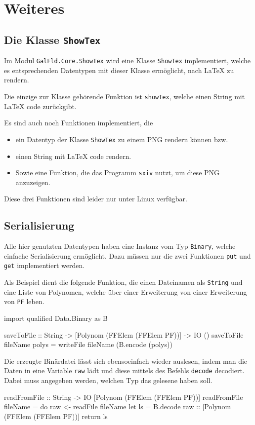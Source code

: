 \section{Weiteres}
\subsection{Die Klasse \texttt{ShowTex}}
Im Modul \texttt{GalFld.Core.ShowTex} wird eine Klasse \texttt{ShowTex}
implementiert, welche es entsprechenden Datentypen mit dieser Klasse
ermöglicht, nach \LaTeX{} zu rendern.

Die einzige zur Klasse gehörende Funktion ist \texttt{showTex}, welche einen
String mit \LaTeX{} code zurückgibt.

Es sind auch noch Funktionen implementiert, die 
\begin{itemize}
  \item ein Datentyp der Klasse \texttt{ShowTex} zu einem PNG rendern können
    bzw.
  \item einen String mit \LaTeX{} code rendern.
  \item Sowie eine Funktion, die das Programm \texttt{sxiv} nutzt, um diese PNG
    anzuzeigen.
\end{itemize}
Diese drei Funktionen sind leider nur unter Linux verfügbar.


\subsection{Serialisierung}
Alle hier genutzten Datentypen haben eine Instanz vom Typ \texttt{Binary},
welche einfache Serialisierung ermöglicht. Dazu müssen nur die zwei Funktionen
\texttt{put} und \texttt{get} implementiert werden.

Als Beispiel dient die folgende Funktion, die einen Dateinamen als
\texttt{String} und eine Liste von Polynomen, welche über einer Erweiterung von
einer Erweiterung von \texttt{PF} leben.
\begin{hcode}
import qualified Data.Binary as B

saveToFile :: String -> [Polynom (FFElem (FFElem PF))] -> IO ()
saveToFile fileName polys = writeFile fileName (B.encode (polys))
\end{hcode}

Die erzeugte Binärdatei lässt sich ebensoeinfach wieder auslesen, indem man die
Daten in eine Variable \texttt{raw} lädt und diese mittels des Befehls
\texttt{decode} decodiert. Dabei muss angegeben werden, welchen Typ das
gelesene haben soll.
\begin{hcode}
readFromFile :: String -> IO [Polynom (FFElem (FFElem PF))]
readFromFile fileName = do
  raw <- readFile fileName
  let ls = B.decode raw :: [Polynom (FFElem (FFElem PF))]
  return ls
\end{hcode}

